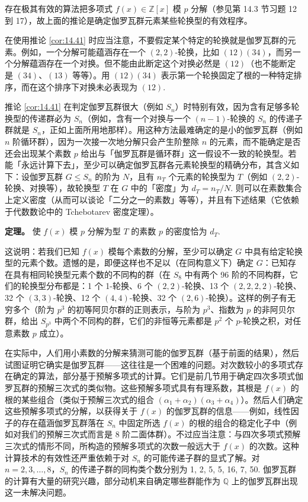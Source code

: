 存在极其有效的算法把多项式 \(f(x) \in \mathbb{Z}[x]\) 模 \(p\) 分解（参见第 14.3 节习题 12 到 17），故上面的推论是确定伽罗瓦群元素某些轮换型的有效程序。

在使用推论 \ref{cor:14.41} 时应当注意，不要假定某个特定的轮换就是伽罗瓦群的元素。例如，一个分解可能蕴涵存在一个 \((2,2)\)-轮换，比如 \((12)(34)\)，而另一个分解蕴涵存在一个对换。但不能由此断定这个对换必然是 \((12)\)（也不能断定是 \((34)\)、\((13)\) 等等）。用 \((12)(34)\) 表示第一个轮换固定了根的一种特定排序，而在这个排序下对换未必表现为 \((12)\).

推论 \ref{cor:14.41} 在判定伽罗瓦群很大（例如 \(S_n\)）时特别有效，因为含有足够多轮换型的传递群必为 \(S_n\)（例如，含有一个对换与一个 \((n-1)\)-轮换的 \(S_n\) 的传递子群就是 \(S_n\)，正如上面所用地那样）。用这种方法最难确定的是小的伽罗瓦群（例如 \(n\) 阶循环群），因为一次接一次地分解只会产生阶整除 \(n\) 的元素，而不能确定是否还会出现某个素数 \(p\) 给出与「伽罗瓦群是循环群」这一假设不一致的轮换型。若能「永远计算下去」，至少可以确定伽罗瓦群各元素轮换型的精确分布，其含义如下：设伽罗瓦群 \(G \leq S_n\) 的阶为 \(N\)，且有 \(n_T\) 个元素的轮换型为 \(T\)（例如 \((2,2)\)-轮换、对换等），故轮换型 \(T\) 在 \(G\) 中的「密度」为 \(d_T = n_T/N\). 则可以在素数集合上定义密度（从而可以谈论「二分之一的素数」等等），并且有下述结果（它依赖于代数数论中的 Tchebotarev 密度定理）。

\noindent\textbf{定理。} 使 \(f(x)\) 模 \(p\) 分解为型 \(T\) 的素数 \(p\) 的密度恰为 \(d_T\).

这说明：若我们已知 \(f(x)\) 模每个素数的分解，至少可以确定 \(G\) 中具有给定轮换型的元素个数。遗憾的是，即便这样也不足以（在同构意义下）确定 \(G\)：已知存在具有相同轮换型元素个数的不同构的群（在 \(S_8\) 中有两个 96 阶的不同构群，它们的轮换型分布都是：1 个 1-轮换、6 个 \((2,2)\)-轮换、13 个 \((2,2,2,2)\)-轮换、32 个 \((3,3)\)-轮换、12 个 \((4,4)\)-轮换、32 个 \((2,6)\)-轮换）。这样的例子有无穷多个（阶为 \(p^3\) 的初等阿贝尔群的正则表示，与阶为 \(p^3\)、指数为 \(p\) 的非阿贝尔群，给出 \(S_{p^3}\) 中两个不同构的群，它们的非恒等元素都是 \(p^2\) 个 \(p\)-轮换之积，对任意素数 \(p\) 成立）。

在实际中，人们用小素数的分解来猜测可能的伽罗瓦群（基于前面的结果），然后试图证明它确实是伽罗瓦群——这往往是一个困难的问题。对次数较小的多项式存在确定的算法，部分基于预解多项式的计算。它们是前几节用于确定四次多项式伽罗瓦群的预解三次式的类似物。这些预解多项式具有有理系数，其根是 \(f(x)\) 的根的某些组合（类似于预解三次式的组合 \((\alpha_1+\alpha_2)(\alpha_3+\alpha_4)\)）。然后人们确定这些预解多项式的分解，以获得关于 \(f(x)\) 的伽罗瓦群的信息——例如，线性因子的存在蕴涵伽罗瓦群落在 \(S_n\) 中固定所选 \(f(x)\) 的根的组合的稳定化子中（例如对我们的预解三次式而言是 8 阶二面体群）。不过应当注意：与四次多项式预解三次式的情形不同，所构造的预解多项式的次数一般远大于 \(f(x)\) 的次数。这种计算技术的有效性还严重依赖于对 \(S_n\) 的可能传递子群的显式了解。对 \(n = 2, 3, \ldots, 8\)，\(S_n\) 的传递子群的同构类个数分别为 1, 2, 5, 5, 16, 7, 50. 伽罗瓦群的计算有大量的研究兴趣，部分动机来自确定哪些群能作为 \(\mathbb{Q}\) 上的伽罗瓦群出现这一未解决问题。

